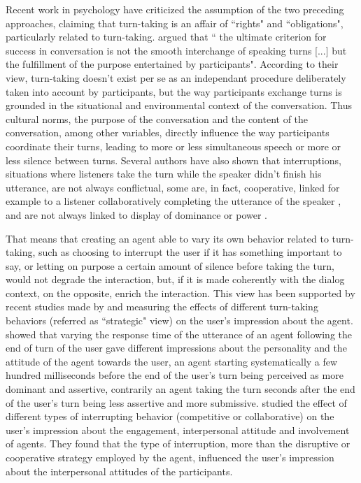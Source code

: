 Recent work in psychology have criticized
the assumption of the two preceding approaches, claiming that turn-taking is an affair of ``rights" and ``obligations", particularly related to turn-taking. \citep{oconnell_turn-taking_1990} argued that `` the ultimate criterion for success in conversation is not the smooth interchange of speaking
turns [...] but the fulfillment of the purpose entertained
by participants". According to their view, turn-taking
doesn't exist per se as an independant procedure deliberately
taken into account by participants, but the way
participants exchange turns is grounded in the situational
and environmental context of the conversation.
Thus cultural norms, the purpose of the conversation
and the content of the conversation, among other variables,
directly influence the way participants coordinate
their turns, leading to more or less simultaneous speech
or more or less silence between turns. Several authors
have also shown that interruptions, situations where listeners
take the turn while the speaker didn't finish his
utterance, are not always conflictual, some are, in fact,
cooperative, linked for example to a listener collaboratively
completing the utterance of the speaker \citep{clancy_co-constructed_2015}, and
are not always linked to display of dominance or power
\citep{goldberg_interrupting_1990}.

That means that creating an agent able to vary its
own behavior related to turn-taking, such as choosing to
interrupt the user if it has something important to say,
or letting on purpose a certain amount of silence before
taking the turn, would not degrade the interaction, but,
if it is made coherently with the dialog context, on the
opposite, enrich the interaction. This view has been
supported by recent studies made by \citep{ter_maat_how_2010} and \citep{cafaro_effects_2016} measuring
the effects of different turn-taking behaviors (referred as ``strategic" view) on
the user's impression about the agent.
\citep{ter_maat_how_2010} showed that varying the response time of the utterance of an agent following the end of turn of the user gave different impressions about the personality and the attitude of the agent towards the user, an agent starting systematically a few hundred milliseconds before the end of the user's turn being perceived as more dominant and assertive, contrarily an agent taking the turn seconds after the end of the user's turn being less assertive and more submissive.  
\citep{cafaro_effects_2016} studied the effect of different types of interrupting
behavior (competitive or collaborative) on the user's
impression about the engagement, interpersonal attitude
and involvement of agents. They found that the type of interruption, more than
the disruptive or cooperative strategy employed by the
agent, influenced the user's impression about the interpersonal
attitudes of the participants.

